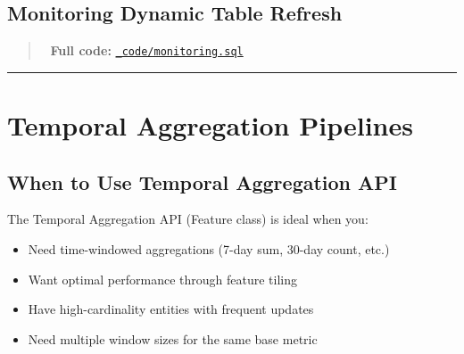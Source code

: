 \documentclass[
  letterpaper,
  DIV=11,
  numbers=noendperiod]{scrreprt}
\newenvironment{Shaded}{\begin{snugshade}}{\end{snugshade}}
\newcommand{\CharTok}[1]{\textcolor[rgb]{0.13,0.47,0.30}{#1}}
\newcommand{\CommentTok}[1]{\textcolor[rgb]{0.37,0.37,0.37}{#1}}
\newcommand{\DecValTok}[1]{\textcolor[rgb]{0.68,0.00,0.00}{#1}}
\newcommand{\KeywordTok}[1]{\textcolor[rgb]{0.00,0.23,0.31}{#1}}
\newcommand{\NormalTok}[1]{\textcolor[rgb]{0.00,0.23,0.31}{#1}}
\newcommand{\OperatorTok}[1]{\textcolor[rgb]{0.37,0.37,0.37}{#1}}
\newcommand{\StringTok}[1]{\textcolor[rgb]{0.13,0.47,0.30}{#1}}
\providecommand{\tightlist}{%
  \setlength{\itemsep}{0pt}\setlength{\parskip}{0pt}}\usepackage{longtable,booktabs,array}
\begin{document}
\hypertarget{monitoring-dynamic-table-refresh}{%
\subsection{Monitoring Dynamic Table
Refresh}\label{monitoring-dynamic-table-refresh}}

\begin{quote}
📁 \textbf{Full code:}
\href{_code/monitoring.sql}{\texttt{\_code/monitoring.sql}}
\end{quote}

\begin{Shaded}
\end{Shaded}

\begin{center}\rule{0.5\linewidth}{0.5pt}\end{center}

\hypertarget{sec-temporal-api}{%
\section{Temporal Aggregation Pipelines}\label{sec-temporal-api}}

\hypertarget{when-to-use-temporal-aggregation-api}{%
\subsection{When to Use Temporal Aggregation
API}\label{when-to-use-temporal-aggregation-api}}

The Temporal Aggregation API (Feature class) is ideal when you:

\begin{itemize}
\tightlist
\item
  Need time-windowed aggregations (7-day sum, 30-day count, etc.)
\item
  Want optimal performance through feature tiling
\item
  Have high-cardinality entities with frequent updates
\item
  Need multiple window sizes for the same base metric
\end{itemize}
\end{document}

